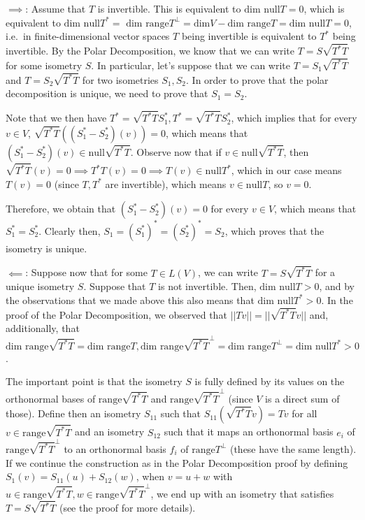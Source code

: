 \begin{solution}

    $\implies$: Assume that $T$ is invertible. This is equivalent to $\text{dim null}T = 0$, which is equivalent to $\text{dim null} T^* = \text{ dim range} T^\bot = \text{dim} V - \text{dim range} T = \text{dim null} T = 0$, i.e.\, in finite-dimensional vector spaces $T$ being invertible is equivalent to $T^*$ being invertible. By the Polar Decomposition, we know that we can write $T = S\sqrt{T^*T}$ for some isometry $S$. In particular, let's suppose that we can write $T = S_1\sqrt{T^*T}$ and $T = S_2\sqrt{T^*T}$ for two isometries $S_1, S_2$. In order to prove that the polar decomposition is unique, we need to prove that $S_1 = S_2$. 
    
    Note that we then have $T^* = \sqrt{T^*T}S_1^*, T^* = \sqrt{T^*T}S_2^*$, which implies that for every $v \in V$, $\sqrt{T^*T}((S_1^* - S_2^*)(v)) = 0$, which means that $(S_1^* - S_2^*)(v) \in \text{null} \sqrt{T^*T}$. Observe now that if $v \in \text{null} \sqrt{T^*T}$, then $\sqrt{T^*T}(v) = 0 \implies T^*T(v) = 0 \implies T(v) \in \text{null} T^*$, which in our case means $T(v) = 0$ (since $T, T^*$ are invertible), which means $v \in \text{null} T$, so $v = 0$. 
    
    Therefore, we obtain that $(S_1^* - S_2^*)(v) = 0$ for every $v \in V$, which means that $S_1^* = S_2^*$. Clearly then, $S_1 = (S_1^*)^* = (S_2^*)^* = S_2$, which proves that the isometry is unique.

    $\impliedby$: Suppose now that for some $T \in L(V)$, we can write $T = S\sqrt{T^*T}$ for a unique isometry $S$. Suppose that $T$ is not invertible. Then, $\text{dim null} T > 0$, and by the observations that we made above this also means that $\text{dim null} T^* > 0$. In the proof of the Polar Decomposition, we observed that $\lvert \lvert Tv \rvert \rvert = \lvert \lvert \sqrt{T^*T}v \rvert \rvert$ and, additionally, that $\text{dim range} \sqrt{T^*T} = \text{dim range} T, \text{dim range} \sqrt{T^*T}^\bot = \text{dim range} T^\bot = \text{dim null} T^* > 0$.

    The important point is that the isometry $S$ is fully defined by its values on the orthonormal bases of $\text{range} \sqrt{T^*T}$ and $\text{range} \sqrt{T^*T}^\bot$ (since $V$ is a direct sum of those). Define then an isometry $S_{11}$ such that $S_{11}(\sqrt{T^*T}v) = Tv$ for all $v \in \text{range} \sqrt{T^*T}$ and an isometry $S_12$ such that it maps an orthonormal basis $e_i$ of $\text{range} \sqrt{T^*T}^\bot$ to an orthonormal basis $f_i$ of $\text{range} T^\bot$ (these have the same length). If we continue the construction as in the Polar Decomposition proof by defining $S_1(v) = S_{11}(u) + S_{12}(w)$, when $v = u + w$ with $u \in \text{range} \sqrt{T^*T}, w \in \text{range} \sqrt{T^*T}^\bot$, we end up with an isometry that satisfies $T = S\sqrt{T^*T}$ (see the proof for more details).


\end{solution}
